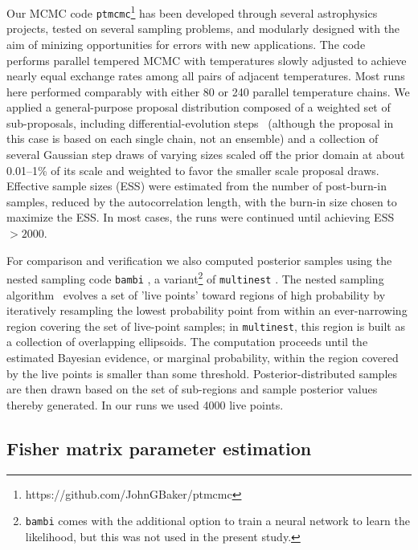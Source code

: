 \documentclass[aps,showpacs,twocolumn,prd,superscriptaddress,nofootinbib]{revtex4-1}
\begin{document}
Our MCMC code \texttt{ptmcmc}\footnote{https://github.com/JohnGBaker/ptmcmc} has been developed through several astrophysics projects, tested on several sampling problems, and modularly designed with the aim of minizing opportunities for errors with new applications. The code performs parallel tempered MCMC \cite{SwendsenWang86, LittenbergCornish09} with temperatures slowly adjusted to achieve nearly equal exchange rates among all pairs of adjacent temperatures.  Most runs here performed comparably with either 80 or 240 parallel temperature chains.
We applied a general-purpose proposal distribution composed of a weighted set of sub-proposals, including differential-evolution steps~\cite{Braak06, BraakVrugt08} (although the proposal in this case is based on each single chain, not an ensemble) and a collection of several Gaussian step draws of varying sizes scaled off the prior domain at about 0.01--1\% of its scale and weighted to favor the smaller scale proposal draws.
Effective sample sizes (ESS) were estimated from the number of post-burn-in samples, reduced by the autocorrelation length, with the burn-in size chosen to maximize the ESS. In most cases, the runs were continued until achieving ESS~$>2000$.

For comparison and verification we also computed posterior samples using the nested sampling code \texttt{bambi} \cite{Graff+11}, a variant\footnote{\texttt{bambi} comes with the additional option to train a neural network to learn the likelihood, but this was not used in the present study.} of \texttt{multinest} \cite{Feroz+09}. The nested sampling algorithm~\cite{Skilling06} evolves a set of 'live points' toward regions of high probability by iteratively resampling the lowest probability point from within an ever-narrowing region covering the set of live-point samples; in \texttt{multinest}, this region is built as a collection of overlapping ellipsoids. The computation proceeds until the estimated Bayesian evidence, or marginal probability, within the region covered by the live points is smaller than some threshold. Posterior-distributed samples are then drawn based on the set of sub-regions and sample posterior values thereby generated. In our runs we used 4000 live points.



\subsection{Fisher matrix parameter estimation}
\label{subsec:Fisher}
\end{document}
